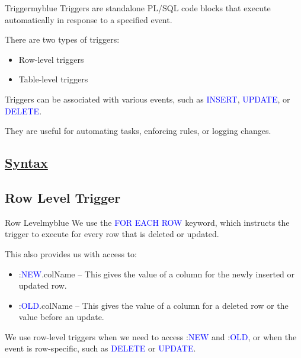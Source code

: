 \begin{prettyBox}{Trigger}{myblue}
Triggers are standalone PL/SQL code blocks that execute automatically in response to a specified event.  

\vspace{0.15cm}
There are two types of triggers:  
\begin{itemize}
    \item Row-level triggers  
    \item Table-level triggers  
\end{itemize}

Triggers can be associated with various events, such as \textcolor{blue}{INSERT}, \textcolor{blue}{UPDATE}, or \textcolor{blue}{DELETE}.  

\vspace{0.15cm}
They are useful for automating tasks, enforcing rules, or logging changes.  
\end{prettyBox}

\subsection*{\underline{Syntax}}





\subsection{Row Level Trigger}

\begin{prettyBox}{Row Level}{myblue}
We use the \textcolor{blue}{FOR EACH ROW} keyword, which instructs the trigger
to execute for every row that is deleted or updated.

This also provides us with access to:
\begin{itemize}
    \item :\textcolor{blue}{NEW}.colName – This gives the value of a column for the newly inserted or updated row.
    \item :\textcolor{blue}{OLD}.colName – This gives the value of a column for a deleted row or the value before an update.
\end{itemize}

We use row-level triggers when we need to access :\textcolor{blue}{NEW} and :\textcolor{blue}{OLD}, or when the event is row-specific, such as \textcolor{blue}{DELETE} or \textcolor{blue}{UPDATE}.
\end{prettyBox}\newpage

